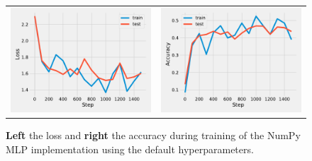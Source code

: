 \documentclass{article}
\newcommand\·{\ensuremath{\cdot}}
\newcommand\…{\ensuremath{\dots}}
\newcommand{\⇔}{\ensuremath{\iff}}
\newcommand{\⇐}{\ensuremath{\impliedby}}
\newcommand{\⇒}{\ensuremath{\implies}}
\newcommand\1{\ensuremath{\mathds{1}}}
\newcommand\ℝ{\ensuremath{\mathds{R}}}
\begin{document}
\begin{figure}
  \begin{tabularx}{\linewidth}{XX}
    \includegraphics[width=\linewidth]{assignment_1/code/np_loss.pdf} &
    \includegraphics[width=\linewidth]{assignment_1/code/np_accuracy.pdf}
  \end{tabularx}
  \caption{\textbf{Left} the loss and \textbf{right} the accuracy during training of the NumPy MLP implementation using the default hyperparameters.}
  \label{fig:numpy}
\end{figure}
\end{document}
